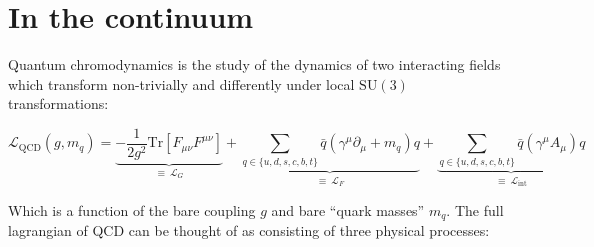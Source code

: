 \documentclass[11pt]{article}
\begin{document}
\maketitle

\tableofcontents


\newpage

\pagebreak

\section{In the continuum}

Quantum chromodynamics is the study of the dynamics of two interacting fields which transform non-trivially and differently under local $\mathrm{SU}(3)$ transformations:

\begin{equation}\label{eq:L_QCD}\mathcal L_{\mathrm{QCD}}(g,m_q)=\underbrace{-\frac{1}{2g^2}\mathrm{Tr}[F_{\mu\nu}F^{\mu\nu}]}_{\equiv\ \mathcal L_G}+\underbrace{\sum_{q\in\{u,d,s,c,b,t\}}\bar q(\gamma^\mu\partial_\mu+m_q)q}_{\equiv\ \mathcal L_F}+\underbrace{\sum_{q\in\{u,d,s,c,b,t\}}\bar q(\gamma^\mu A_\mu)q}_{\equiv\ \mathcal L_{\mathrm{int}}}\end{equation}

Which is a function of the bare coupling $g$ and bare ``quark masses'' $m_q$. The full lagrangian of QCD can be thought of as consisting of three physical processes:
\end{document}
